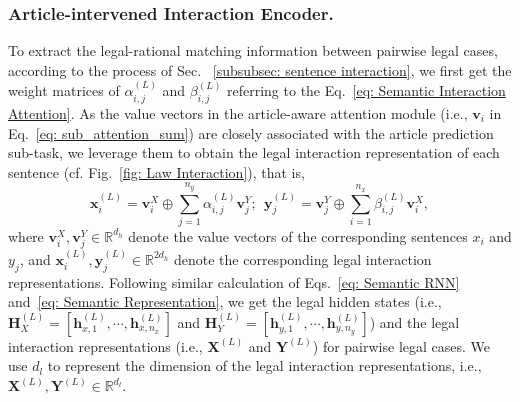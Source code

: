 \subsubsection{Article-intervened Interaction Encoder.}\label{subsubsec: law interaction encoder}
To extract the legal-rational matching information between pairwise legal cases, according to the process of Sec.~ \ref{subsubsec: sentence interaction}, we first get the weight matrices of $\alpha_{i, j}^{(L)}$ and $\beta_{i, j}^{(L)}$ referring to the Eq.~\ref{eq: Semantic Interaction Attention}.
As the value vectors in the article-aware attention module (i.e., $\textbf{v}_i$ in Eq.~\ref{eq: sub_attention_sum}) are closely associated with the article prediction sub-task, we leverage them to obtain the legal interaction representation of each sentence (cf. Fig.~\ref{fig: Law Interaction}), that is,
\begin{equation} \label{eq: legal_inter_rep}
\mathbf{x}_i^{(L)} = \mathbf{v}_i^X \oplus \sum_{j=1}^{n_y}\alpha_{i, j}^{(L)}\mathbf{v}_j^Y;
\ \ 
\mathbf{y}_j^{(L)} = \mathbf{v}_j^Y \oplus \sum_{i=1}^{n_x}\beta_{i, j}^{(L)}\mathbf{v}_i^X,
\end{equation}
where $\mathbf{v}_i^X, \mathbf{v}_j^Y \in \mathbb{R}^{d_h}$ denote the value vectors of the corresponding sentences $x_i$ and $y_j$, 
and $\mathbf{x}_i^{(L)}, \mathbf{y}_j^{(L)} \in \mathbb{R}^{2d_h}$ denote the corresponding legal interaction representations.
Following similar calculation of Eqs.~\ref{eq: Semantic RNN} and~\ref{eq: Semantic Representation}, we get the legal hidden states (i.e., $\textbf{H}_{X}^{(L)} = [\mathbf{h}_{x,1}^{(L)}, \cdots, \mathbf{h}_{x,n_x}^{(L)}]$ and $\textbf{H}_{Y}^{(L)} = [\mathbf{h}_{y,1}^{(L)}, \cdots, \mathbf{h}_{y,n_y}^{(L)}]$) and the legal interaction representations (i.e., $\mathbf{X}^{(L)}$ and $\mathbf{Y}^{(L)}$) for pairwise legal cases.
We use $d_l$ to represent the dimension of the legal interaction representations, i.e., $\mathbf{X}^{(L)}, \mathbf{Y}^{(L)} \in \mathbb{R}^{d_l}$.

